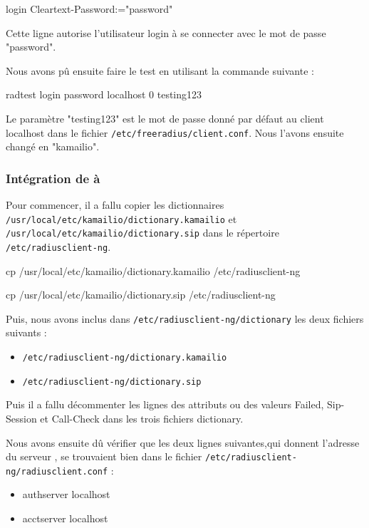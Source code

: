login Cleartext-Password:="password"

Cette ligne autorise l'utilisateur login à se connecter avec le mot de passe "password".

Nous avons pû ensuite faire le test en utilisant la commande suivante :

\begin{shell}
radtest login password localhost 0 testing123
\end{shell}

Le paramètre "testing123" est le mot de passe donné par défaut au client localhost dans le fichier \texttt{/etc/freeradius/client.conf}. Nous l'avons ensuite changé en "kamailio".


\subsubsection{Intégration de {\rad} à {\kam}}

Pour commencer, il a fallu copier les dictionnaires \texttt{/usr/local/etc/kamailio/dictionary.kamailio} et \texttt{/usr/local/etc/kamailio/dictionary.sip} dans le répertoire \texttt{/etc/radiusclient-ng}.

\begin{shell}
cp /usr/local/etc/kamailio/dictionary.kamailio /etc/radiusclient-ng

cp /usr/local/etc/kamailio/dictionary.sip /etc/radiusclient-ng
\end{shell}

Puis, nous avons inclus dans \texttt{/etc/radiusclient-ng/dictionary} les deux fichiers suivants :

\begin{itemize}
\item{\texttt{/etc/radiusclient-ng/dictionary.kamailio}}
\item{\texttt{/etc/radiusclient-ng/dictionary.sip}}
\end{itemize}

Puis il a fallu décommenter les lignes des attributs ou des valeurs Failed, Sip-Session et Call-Check dans les trois fichiers dictionary.

Nous avons ensuite dû vérifier que les deux lignes suivantes,qui donnent l'adresse du serveur {\rad}, se trouvaient bien dans le fichier \texttt{/etc/radiusclient-ng/radiusclient.conf} :

\begin{itemize}
\item{authserver localhost}
\item{acctserver localhost}
\end{itemize}

